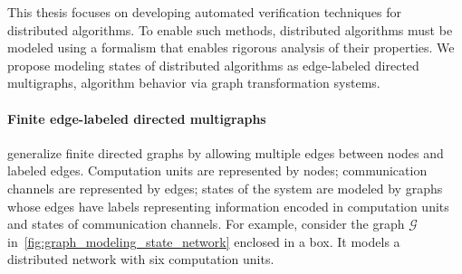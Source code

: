 This thesis focuses on developing automated verification techniques for distributed algorithms. 
To enable such methods, distributed algorithms must be modeled using a formalism that enables
rigorous analysis of their properties. We propose modeling states of distributed algorithms as edge-labeled directed multigraphs, algorithm behavior via graph transformation systems.

\paragraph{Finite edge-labeled directed multigraphs} generalize finite directed graphs by allowing multiple edges between nodes and labeled edges. Computation units are represented by nodes; communication channels are represented by edges; states of the system are modeled by graphs whose edges have labels representing information encoded in computation units and states of communication channels. For example, consider the graph $\mathcal{G}$ in~\autoref{fig:graph_modeling_state_network} enclosed in a box. It models a distributed network with six computation units.
